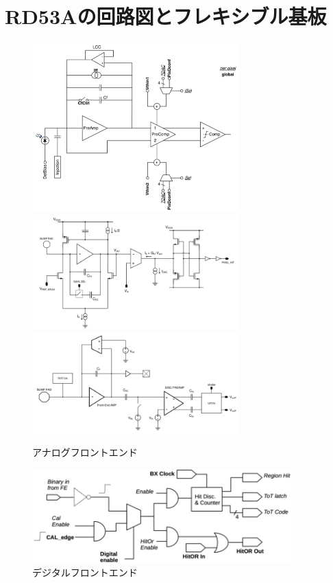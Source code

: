 \chapter{RD53Aの回路図とフレキシブル基板} \label{chap:rd53a_circit}

\begin{figure}[bpt]
  \begin{center}
    \includegraphics[width=8cm]{./diff_fe.png}
    \includegraphics[width=8cm]{./lin_fe.png}
    \includegraphics[width=8cm]{./syn_fe.png}
  \caption[アナログフロントエンド]{アナログフロントエンド\cite{2-1}}
  \label{analog_fe}
  \end{center}
\end{figure}

\begin{figure}[bpt]\centering
\includegraphics[width=10cm]{./digital_fe.png}
\caption[デジタルフロントエンド]{デジタルフロントエンド\cite{2-1}}
\label{digital_fe}
\end{figure}

